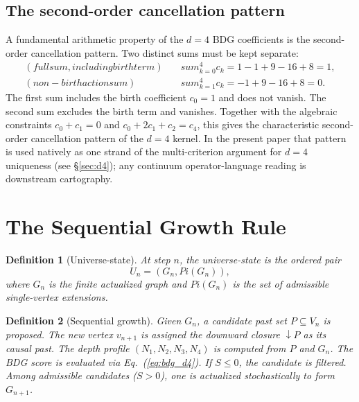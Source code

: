 \documentclass[11pt]{article}
\def\Pi{Pi}%
\def\text#1{#1}%
\def\sum{sum}%
\newtheorem{definition}{Definition}
\newcommand{\Pot}{\Pi}
\begin{document}
\subsection{The second-order cancellation pattern}

A fundamental arithmetic property of the $d=4$ BDG coefficients is the second-order cancellation pattern. Two distinct sums must be kept separate:
\begin{align}
\label{eq:full_sum}
\text{(full sum, including birth term)}\quad & \sum_{k=0}^{4} c_k = 1-1+9-16+8 = 1,\\
\label{eq:dalembert_sum}
\text{(non-birth action sum)}\quad & \sum_{k=1}^{4} c_k = -1+9-16+8 = 0.
\end{align}
The first sum includes the birth coefficient $c_0=1$ and does not vanish. The second sum excludes the birth term and vanishes. Together with the algebraic constraints $c_0+c_1=0$ and $c_0+2c_1+c_2=c_4$, this gives the characteristic second-order cancellation pattern of the $d=4$ kernel. In the present paper that pattern is used natively as one strand of the multi-criterion argument for $d=4$ uniqueness (see \S\ref{sec:d4}); any continuum operator-language reading is downstream cartography.

\section{The Sequential Growth Rule}
\label{sec:engine}

\begin{definition}[Universe-state]
At step $n$, the universe-state is the ordered pair
\begin{equation}
U_n=(G_n,\Pot(G_n)),
\end{equation}
where $G_n$ is the finite actualized graph and $\Pot(G_n)$ is the set of admissible single-vertex extensions.
\end{definition}

\begin{definition}[Sequential growth]
Given $G_n$, a candidate past set $P\subseteq V_n$ is proposed. The new vertex $v_{n+1}$ is assigned the downward closure $\downarrow\!P$ as its causal past. The depth profile $(N_1,N_2,N_3,N_4)$ is computed from $P$ and $G_n$. The BDG score is evaluated via Eq.~(\ref{eq:bdg_d4}). If $S\le 0$, the candidate is filtered. Among admissible candidates ($S>0$), one is actualized stochastically to form $G_{n+1}$.
\end{definition}
\end{document}
